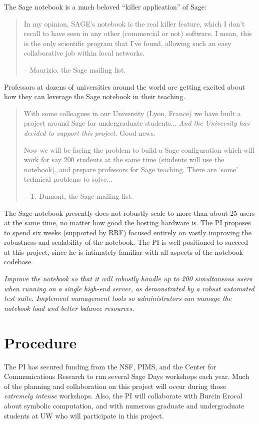 \documentclass[11pt]{article}
\begin{document}
The Sage notebook is a much beloved ``killer application'' of Sage:
\begin{quote}
  In my opinion, SAGE's notebook is the real killer feature, which I
  don't recall to have seen in any other (commercial or not)
  software. I mean, this is the only scientific program that I've
  found, allowing such an easy collaborative job within local
  networks.

 -- Maurizio, the Sage mailing list.
\end{quote}

Professors at dozens of universities around the world are getting
excited about how they can leverage the Sage notebook in their
teaching.
\begin{quote}
With some colleagues in our University (Lyon, France) we have built a
project around Sage for undergraduate students... {\em And the University has
decided to support this project.} Good news.

Now we will be facing the problem to build a Sage configuration which
will work for say 200 students at the same time (students will use the
notebook), and prepare professors for Sage teaching. There are `some'
technical problems to solve...
 
-- T. Dumont, the Sage mailing list.
\end{quote}

The Sage notebook presently does not robustly scale to more than about
25 users at the same time, no matter how good the hosting hardware is.
The PI proposes to spend six weeks (supported by RRF) focused entirely
on vastly improving the robustness and scalability of the notebook.
The PI is well positioned to succeed at this project, since he is
intimately familiar with all aspects of the notebook codebase.

\vspace{2ex}
 {\em Improve the notebook so that it
  will robustly handle up to 200 simultaneous users when running on a
  single high-end server, as demonstrated by a robust automated test
  suite.  Implement management tools so administrators can manage the
  notebook load and better balance resources.}

\newpage
\section{Procedure}

The PI has secured funding from the NSF, PIMS, and the Center for
Communications Research to run several Sage Days workshops each year.
Much of the planning and collaboration on this project will occur
during those {\em extremely intense} workshops. Also, the PI will
collaborate with Burcin Erocal about symbolic computation, and with
numerous graduate and undergraduate students at UW who will
participate in this project.
\end{document}
